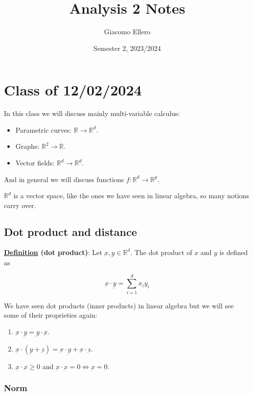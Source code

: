 \documentclass[10pt]{extarticle}
\title{Analysis 2 Notes}
\author{Giacomo Ellero}
\date{Semester 2, 2023/2024}
\newcommand{\R}{\mathbb{R}}
\begin{document}
\maketitle
\tableofcontents
\clearpage

\section{Class of 12/02/2024}

In this class we will discuss mainly multi-variable calculus:
\begin{itemize}
    \item Parametric curves: $\R \to \R^d$.
    \item Graphs: $\R^2 \to \R$.
    \item Vector fields: $\R^d \to \R^d$.
\end{itemize}

And in general we will discuss functions $f: \R^d \to \R^p$.

$\R^d$ is a vector space, like the ones we have seen in linear algebra, so many notions carry over.

\subsection{Dot product and distance}

\textbf{\underline{Definition} (dot product)}: Let $\underbar{x}, \underbar{y} \in \R^d$. The dot product of $x$ and $y$ is defined as

$$
    \underbar{x} \cdot \underbar{y} = \sum_{i=1}^d x_i y_i
$$

We have seen dot products (inner products) in linear algebra but we will see some of their proprieties again:
\begin{enumerate}
    \item $\underbar{x} \cdot \underbar{y} = \underbar{y} \cdot \underbar{x}$.
    \item $\underbar{x} \cdot (\underbar{y} + \underbar{z}) = \underbar{x} \cdot \underbar{y} + \underbar{x} \cdot \underbar{z}$.
    \item $\underbar{x} \cdot \underbar{x} \geq 0$ and $\underbar{x} \cdot \underbar{x} = 0 \iff \underbar{x} = \underbar{0}$.
\end{enumerate}

\subsubsection{Norm}
\end{document}
